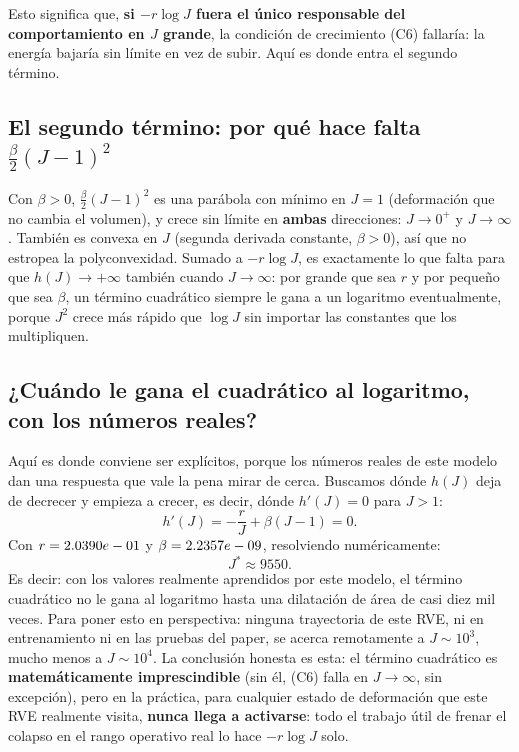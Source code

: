 \documentclass[11pt,a4paper]{article}
\begin{document}
Esto significa que, \textbf{si $-r\log J$ fuera el \'unico
responsable del comportamiento en $J$ grande}, la condici\'on de
crecimiento (C6) fallar\'ia: la energ\'ia bajar\'ia sin l\'imite en
vez de subir. Aqu\'i es donde entra el segundo t\'ermino.

\subsection{El segundo t\'ermino: por qu\'e hace falta $\tfrac\beta2(J-1)^2$}

Con $\beta>0$, $\tfrac\beta2(J-1)^2$ es una par\'abola con m\'inimo en
$J=1$ (deformaci\'on que no cambia el volumen), y crece sin l\'imite
en \textbf{ambas} direcciones: $J\to0^+$ y $J\to\infty$. Tambi\'en es
convexa en $J$ (segunda derivada constante, $\beta>0$), as\'i que no
estropea la polyconvexidad. Sumado a $-r\log J$, es exactamente lo
que falta para que $h(J)\to+\infty$ tambi\'en cuando $J\to\infty$: por
grande que sea $r$ y por peque\~no que sea $\beta$, un t\'ermino
cuadr\'atico siempre le gana a un logaritmo eventualmente, porque
$J^2$ crece m\'as r\'apido que $\log J$ sin importar las constantes
que los multipliquen.

\subsection{¿Cu\'ando le gana el cuadr\'atico al logaritmo, con los n\'umeros reales?}

Aqu\'i es donde conviene ser expl\'icitos, porque los n\'umeros reales
de este modelo dan una respuesta que vale la pena mirar de cerca.
Buscamos d\'onde $h(J)$ deja de decrecer y empieza a crecer, es decir,
d\'onde $h'(J)=0$ para $J>1$:
\[
 h'(J)=-\frac{r}{J}+\beta(J-1)=0.
\]
Con $r=2.0390e-01{}$ y $\beta=2.2357e-09{}$,
resolviendo num\'ericamente:
\begin{equation}
 J^\ast\approx9550.
 \label{eq:appB-volumetric-turning}
\end{equation}
Es decir: con los valores realmente aprendidos por este modelo, el
t\'ermino cuadr\'atico no le gana al logaritmo hasta una dilataci\'on
de \'area de casi diez mil veces. Para poner esto en perspectiva:
ninguna trayectoria de este RVE, ni en entrenamiento ni en las pruebas
del paper, se acerca remotamente a $J\sim10^3$, mucho menos a
$J\sim10^4$. La conclusi\'on honesta es esta: el t\'ermino cuadr\'atico
es \textbf{matem\'aticamente imprescindible} (sin \'el, (C6) falla en
$J\to\infty$, sin excepci\'on), pero en la pr\'actica, para cualquier
estado de deformaci\'on que este RVE realmente visita,
\textbf{nunca llega a activarse}: todo el trabajo \'util de frenar el
colapso en el rango operativo real lo hace $-r\log J$ solo.
\end{document}
